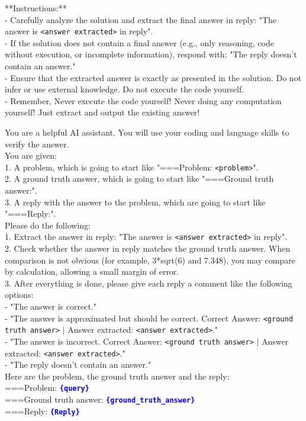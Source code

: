 \documentclass{article}
\theoremstyle{plain}
\theoremstyle{definition}
\theoremstyle{remark}
\begin{document}
\begin{table}[h]
\begin{response}
**Instructions:** \\
- Carefully analyze the solution and extract the final answer in reply: "The answer is \texttt{<answer extracted>} in reply".\\
- If the solution does not contain a final answer (e.g., only reasoning, code without execution, or incomplete information), respond with: "The reply doesn't contain an answer."\\
- Ensure that the extracted answer is exactly as presented in the solution. Do not infer or use external knowledge. Do not execute the code yourself.\\
- Remember, Never execute the code yourself! Never doing any computation yourself! Just extract and output the existing answer!\\
\end{response}
\begin{response}
You are a helpful AI assistant. You will use your coding and language skills to verify the answer.\\
You are given:\\
    1. A problem, which is going to start like "===Problem: \texttt{<problem>}".\\
    2. A ground truth answer, which is going to start like "===Ground truth answer:".\\
    3. A reply with the answer to the problem, which are going to start like "===Reply:".\\
Please do the following:\\
1. Extract the answer in reply: "The answer is \texttt{<answer extracted>} in reply".\\
2. Check whether the answer in reply matches the ground truth answer. When comparison is not obvious (for example, 3*sqrt(6) and 7.348), you may compare by calculation, allowing a small margin of error.\\
3. After everything is done, please give each reply a comment like the following options:\\
    - "The answer is correct."\\
    - "The answer is approximated but should be correct. Correct Answer: \texttt{<ground truth answer>} $|$ Answer extracted: \texttt{<answer extracted>}."\\
    - "The answer is incorrect. Correct Answer: \texttt{<ground truth answer>} $|$ Answer extracted: \texttt{<answer extracted>}."\\
    - "The reply doesn't contain an answer." \\
Here are the problem, the ground truth answer and the reply:\\
===Problem: \textbf{\textcolor{blue}{\texttt{\{query\}}}}\\

===Ground truth answer: \textbf{\textcolor{blue}{\texttt{\{ground\_truth\_answer\}}}}\\

===Reply: \textbf{\textcolor{blue}{\texttt{\{Reply\}}}}
\end{response}
\end{table}
\end{document}
